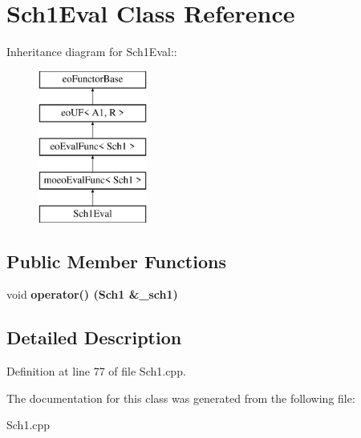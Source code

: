 \section{Sch1Eval Class Reference}
\label{classSch1Eval}
Inheritance diagram for Sch1Eval::\begin{figure}[H]
\begin{center}
\leavevmode
\includegraphics[height=5cm]{classSch1Eval}
\end{center}
\end{figure}
\subsection*{Public Member Functions}
\begin{CompactItemize}
\item 
void \bf{operator()} (\bf{Sch1} \&\_\-sch1)\label{classSch1Eval_4f806a964f7bafa9e4fcca45da458c98}

\end{CompactItemize}


\subsection{Detailed Description}




Definition at line 77 of file Sch1.cpp.

The documentation for this class was generated from the following file:\begin{CompactItemize}
\item 
Sch1.cpp\end{CompactItemize}
